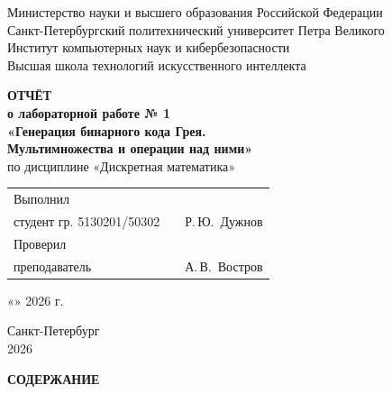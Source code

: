 \documentclass[14pt,a4paper]{extarticle}
\makeatletter
\renewcommand{\tableofcontents}{%
  {\centering\textbf{СОДЕРЖАНИЕ}\par}\vspace{12pt}%
  \@starttoc{toc}}
\newcommand{\StudentGroup}{5130201/50302}
\makeatother
\begin{document}
\begin{titlepage}
\begin{singlespace}
\begin{center}
Министерство науки и высшего образования Российской Федерации\\[2pt]
Санкт-Петербургский политехнический университет Петра Великого\\[2pt]
Институт компьютерных наук и кибербезопасности\\[2pt]
Высшая школа технологий искусственного интеллекта

\vspace{5cm}

\textbf{ОТЧЁТ}\\[6pt]
\textbf{о лабораторной работе № 1}\\[12pt]
\textbf{«Генерация бинарного кода Грея.}\\
\textbf{Мультимножества и операции над ними»}\\[12pt]
по дисциплине «Дискретная математика»
\end{center}

\vspace{4cm}

\noindent
\begin{tabular}{@{}p{7.2cm}p{3.6cm}l@{}}
Выполнил\\
студент гр. \StudentGroup & \underline{\hspace{3cm}} & Р.\,Ю.~Дужнов\\[22pt]
Проверил\\
преподаватель & \underline{\hspace{3cm}} & А.\,В.~Востров\\
\end{tabular}

\vspace{1.2cm}
\noindent\hfill «\underline{\hspace{0.9cm}}» \underline{\hspace{3.2cm}} 2026 г.

\vfill
\begin{center}
Санкт-Петербург\\
2026
\end{center}
\end{singlespace}
\end{titlepage}
\setcounter{page}{2}

\begin{singlespace}
\tableofcontents
\end{singlespace}
\end{document}

